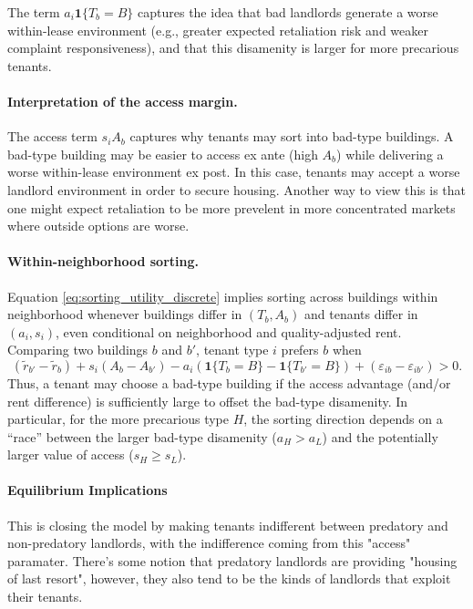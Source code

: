 \documentclass[11pt]{article}
\begin{document}
The term $a_i \mathbf{1}\{T_b=B\}$ captures the idea that bad landlords generate a worse within-lease environment (e.g., greater expected retaliation risk and weaker complaint responsiveness), and that this disamenity is larger for more precarious tenants.
\\

\paragraph{Interpretation of the access margin.}
The access term $s_i A_b$ captures why tenants may sort into bad-type buildings. A bad-type building may be easier to access ex ante (high $A_b$) while delivering a worse within-lease environment ex post. In this case, tenants may accept a worse landlord environment in order to secure housing. Another way to view this is that one might expect retaliation to be more prevelent in more concentrated markets where outside options are worse. 

\paragraph{Within-neighborhood sorting.}
Equation \eqref{eq:sorting_utility_discrete} implies sorting across buildings within neighborhood whenever buildings differ in $(T_b, A_b)$ and tenants differ in $(a_i,s_i)$, even conditional on neighborhood and quality-adjusted rent. Comparing two buildings $b$ and $b'$, tenant type $i$ prefers $b$ when
\begin{equation}
(\tilde r_{b'}-\tilde r_b) + s_i(A_b-A_{b'}) - a_i\left(\mathbf{1}\{T_b=B\} - \mathbf{1}\{T_{b'}=B\}\right) + (\varepsilon_{ib}-\varepsilon_{ib'}) > 0.
\end{equation}
Thus, a tenant may choose a bad-type building if the access advantage (and/or rent difference) is sufficiently large to offset the bad-type disamenity. In particular, for the more precarious type $H$, the sorting direction depends on a ``race'' between the larger bad-type disamenity ($a_H > a_L$) and the potentially larger value of access ($s_H \ge s_L$).

\paragraph{Equilibrium Implications}

This is closing the model by making tenants indifferent between predatory and non-predatory landlords, with the indifference coming from this "access" paramater. There's some notion that predatory landlords are providing "housing of last resort", however, they also tend to be the kinds of landlords that exploit their tenants.
\\
\end{document}
